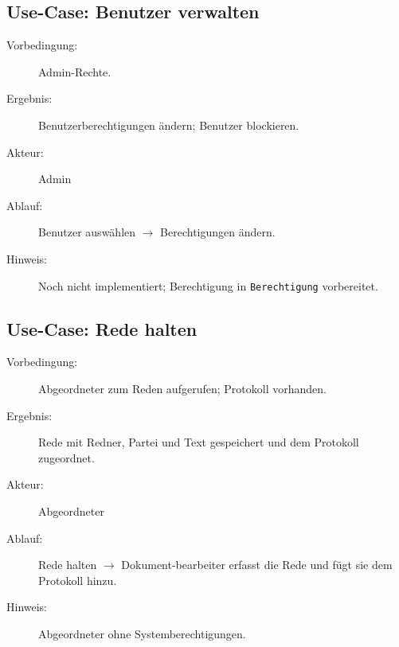 \subsection{Use-Case: Benutzer verwalten}
\begin{description}
    \item[Vorbedingung:] Admin-Rechte.
    \item[Ergebnis:] Benutzerberechtigungen ändern; Benutzer blockieren.
    \item[Akteur:] Admin
    \item[Ablauf:] Benutzer auswählen $\rightarrow$ Berechtigungen ändern.
    \item[Hinweis:] Noch nicht implementiert; Berechtigung in \texttt{Berechtigung} vorbereitet.
\end{description}

\subsection{Use-Case: Rede halten}
\begin{description}
    \item[Vorbedingung:] Abgeordneter zum Reden aufgerufen; Protokoll vorhanden.
    \item[Ergebnis:] Rede mit Redner, Partei und Text gespeichert und dem Protokoll zugeordnet.
    \item[Akteur:] Abgeordneter
    \item[Ablauf:] Rede halten $\rightarrow$ Dokument-bearbeiter erfasst die Rede und fügt sie dem Protokoll hinzu.
    \item[Hinweis:] Abgeordneter ohne Systemberechtigungen.
\end{description}